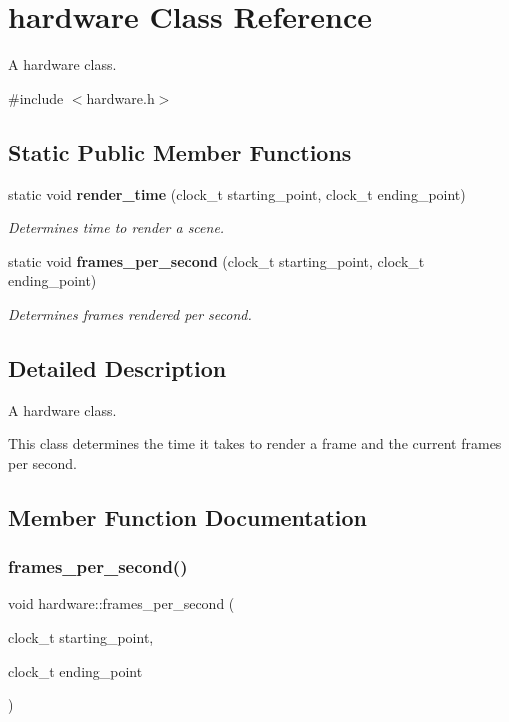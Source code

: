 \section{hardware Class Reference}
\label{classhardware}


A hardware class.  




{\ttfamily \#include $<$hardware.\+h$>$}

\subsection*{Static Public Member Functions}
\begin{DoxyCompactItemize}
\item 
static void \textbf{ render\+\_\+time} (clock\+\_\+t starting\+\_\+point, clock\+\_\+t ending\+\_\+point)
\begin{DoxyCompactList}\small\item\em Determines time to render a scene. \end{DoxyCompactList}\item 
static void \textbf{ frames\+\_\+per\+\_\+second} (clock\+\_\+t starting\+\_\+point, clock\+\_\+t ending\+\_\+point)
\begin{DoxyCompactList}\small\item\em Determines frames rendered per second. \end{DoxyCompactList}\end{DoxyCompactItemize}


\subsection{Detailed Description}
A hardware class. 

This class determines the time it takes to render a frame and the current frames per second. 

\subsection{Member Function Documentation}
\mbox{\label{classhardware_a34e3f2b304945ac833208484d50df42e}} 
\subsubsection{frames\_per\_second()}
{\footnotesize\ttfamily void hardware\+::frames\+\_\+per\+\_\+second (\begin{DoxyParamCaption}\item[{clock\+\_\+t}]{starting\+\_\+point,  }\item[{clock\+\_\+t}]{ending\+\_\+point }\end{DoxyParamCaption})\hspace{0.3cm}{\ttfamily [static]}}



